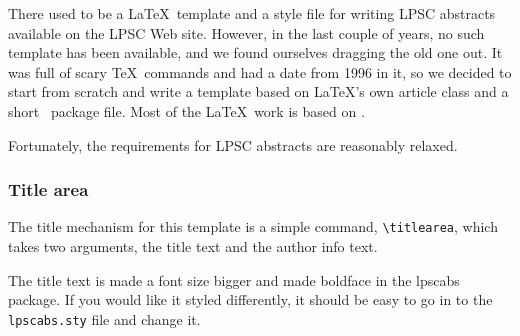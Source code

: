 \documentclass[twoside]{article}
\begin{document}


%

%



There used to be a \LaTeX\ template and a style file for writing
LPSC abstracts available on the LPSC Web site.  However, in the
last couple of years, no such template has been available, and we
found ourselves dragging the old one out.  It was full of scary \TeX\
commands and had a date from 1996 in it, so we decided to start from
scratch and write a template based on \LaTeX's own article class and 
a short \LaTeXe\ package file.  Most of the \LaTeX\ work is based on
\citet{latexguide}.

Fortunately, the requirements for LPSC abstracts \citep{LPSC} are
reasonably relaxed.

\subsubsection*{Title area}

The title mechanism for this template is a simple command,
\verb=\titlearea=, which takes two arguments, the title text and the
author info text.

The title text is made a font size bigger and made boldface in the
lpscabs package.  If you would like it styled differently, it should
be easy to go in to the \texttt{lpscabs.sty} file and change it.
\end{document}
